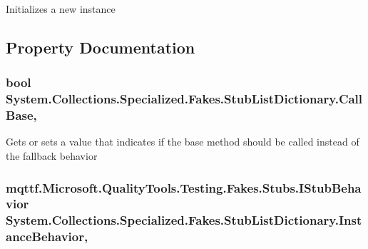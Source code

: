 Initializes a new instance



\subsection{Property Documentation}
\hypertarget{class_system_1_1_collections_1_1_specialized_1_1_fakes_1_1_stub_list_dictionary_adc4b6612fcb3e401f7103ec7cebe0c34}{
\subsubsection[{Call\-Base}]{\setlength{\rightskip}{0pt plus 5cm}bool System.\-Collections.\-Specialized.\-Fakes.\-Stub\-List\-Dictionary.\-Call\-Base\hspace{0.3cm}{\ttfamily [get]}, {\ttfamily [set]}}}\label{class_system_1_1_collections_1_1_specialized_1_1_fakes_1_1_stub_list_dictionary_adc4b6612fcb3e401f7103ec7cebe0c34}


Gets or sets a value that indicates if the base method should be called instead of the fallback behavior

\hypertarget{class_system_1_1_collections_1_1_specialized_1_1_fakes_1_1_stub_list_dictionary_aaf2bf1679c05b849262563df635795f7}{
\subsubsection[{Instance\-Behavior}]{\setlength{\rightskip}{0pt plus 5cm}mqttf.\-Microsoft.\-Quality\-Tools.\-Testing.\-Fakes.\-Stubs.\-I\-Stub\-Behavior System.\-Collections.\-Specialized.\-Fakes.\-Stub\-List\-Dictionary.\-Instance\-Behavior\hspace{0.3cm}{\ttfamily [get]}, {\ttfamily [set]}}}\label{class_system_1_1_collections_1_1_specialized_1_1_fakes_1_1_stub_list_dictionary_aaf2bf1679c05b849262563df635795f7}


